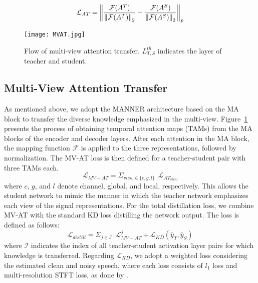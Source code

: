 \documentclass[a4paper]{article}
\begin{document}
\begin{equation}
  \mathcal{L}_{AT} = \left\Vert \frac{\mathcal{F}(A^T)}{\left\Vert\mathcal{F}(A^T)\right\Vert_2} - \frac{\mathcal{F}(A^S)}{\left\Vert\mathcal{F}(A^S)\right\Vert_2} \right\Vert_p
  \label{eq2}
\end{equation}
\begin{figure}[t]
  \centering
  \texttt{[image: MVAT.jpg]}
  \caption{Flow of multi-view attention transfer. $L_{T,S}^{th}$ indicates the layer of teacher and student.}
  \label{fig:MVAT}
\end{figure}
\subsection{Multi-View Attention Transfer}
As mentioned above, we adopt the MANNER architecture based on the MA block to transfer the diverse knowledge emphasized in the multi-view. Figure~\ref{fig:MVAT} presents the process of obtaining temporal attention maps (TAMs) from the MA blocks of the encoder and decoder layers. After each attention in the MA block, the mapping function $\mathcal{F}$ is applied to the three representations, followed by normalization. The MV-AT loss is then defined for a teacher-student pair with three TAMs each.
\begin{equation}
  \mathcal{L}_{MV-AT} = \Sigma_{view \in \{c,g,l\}} \;\, \mathcal{L}_{AT_{view}}
  \label{eq3}
\end{equation}
where $c$, $g$, and $l$ denote channel, global, and local, respectively. This allows the student network to mimic the manner in which the teacher network emphasizes each view of the signal representations. For the total distillation loss, we combine MV-AT with the standard KD loss distilling the network output. The loss is defined as follows:
\begin{equation}
  \mathcal{L}_{distill} = \Sigma_{j \in \mathcal{I}} \;\, \mathcal{L}^{j}_{MV-AT} + \mathcal{L}_{KD}(\hat{y}_T, \hat{y}_S)
  \label{eq4}
\end{equation}
where $\mathcal{I}$ indicates the index of all teacher-student activation layer pairs for which knowledge is transferred. 
Regarding $\mathcal{L}_{KD}$, we adopt a weighted loss considering the estimated clean and noisy speech, where each loss consists of $l_1$ loss and multi-resolution STFT loss, as done by \cite{park2022manner}.
\end{document}
